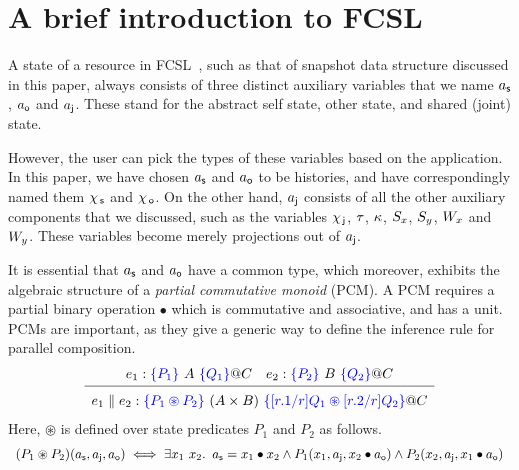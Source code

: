 \section{A brief introduction to FCSL}
\label{sc:background}

A state of a resource in FCSL~\cite{NanevskiLSD+ESOP14}, such as that
of snapshot data structure discussed in this paper, always consists of
three distinct auxiliary variables that we name $a_{\mathsf{s}}$, $a_{\mathsf{o}}$ and
$a_{\mathsf{j}}$. These stand for the abstract self state, other state, and
shared (joint) state.

However, the user can pick the types of these variables based on the
application. In this paper, we have chosen $a_{\mathsf{s}}$ and $a_{\mathsf{o}}$ to be
histories, and have correspondingly named them $\chi_{\, \mathsf{s}}$ and $\chi_{\, \mathsf{o}}$.
On the other hand, $a_{\mathsf{j}}$ consists of all the other auxiliary
components that we discussed, such as the variables $\chi_{\, \mathsf{j}}$, $\tau$,
$\kappa$, $S_x$, $S_y$, $W_x$ and $W_y$. These variables become merely
projections out of $a_{\mathsf{j}}$.

It is essential that $a_{\mathsf{s}}$ and $a_{\mathsf{o}}$ have a common type, which
moreover, exhibits the algebraic structure of a \emph{partial
  commutative monoid} (PCM). A PCM requires a partial binary operation
$\bullet$ which is commutative and associative, and has a unit. 
%
%
PCMs are important, as they give a generic way to define the inference
rule for parallel composition.
%
\[
\hfill\begin{array}{c}
  e_1 : \specK{\{P_1\}}\ A\ \specK{\{Q_1\}} @ C \quad
  e_2 : \specK{\{P_2\}}\ B\ \specK{\{Q_2\}} @ C \\[2pt]
\hline\\[-7pt]
e_1 \parallel e_2 : \specK{\{P_1 \circledast P_2\}}\ (A \times B)\
\specK{\{[r.1/r]Q_1 \circledast [r.2/r]Q_2\}} @ C
\end{array}\hfill
\]
Here, $\circledast$ is defined over state predicates $P_1$ and $P_2$
as follows.
\[
\hfill\begin{array}{c}
  (P_1 \circledast P_2) (a_\lcl, a_\joint, a_\env) \iff
  \exists x_1~x_2\ldot\
  a_\lcl = x_1 \bullet x_2 \wedge
  P_1 (x_1, a_\joint, x_2 \bullet a_\env) \wedge
  P_2 (x_2, a_\joint, x_1 \bullet a_\env)
\end{array}\hfill
\]

